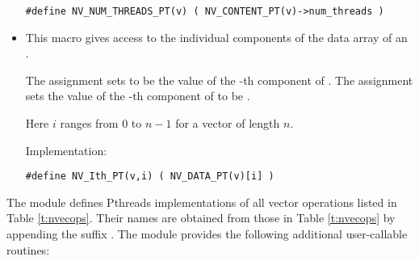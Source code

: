 \begin{itemize}
  \verb|#define NV_NUM_THREADS_PT(v) ( NV_CONTENT_PT(v)->num_threads )|

\item {}                                               
                                                            
  This macro gives access to the individual components of the data
  array of an .

  The assignment  sets  to be the value of 
  the -th component of . The assignment    
  sets the value of the -th component of  to be .        
  
  Here $i$ ranges from $0$ to $n-1$ for a vector of length $n$.

  Implementation:

  \verb|#define NV_Ith_PT(v,i) ( NV_DATA_PT(v)[i] )|

\end{itemize}
The {\nvecpthreads} module defines Pthreads implementations of all vector operations listed 
in Table \ref{t:nvecops}. Their names are obtained from those in Table \ref{t:nvecops} by
appending the suffix . The module {\nvecpthreads} provides the following additional
user-callable routines:
